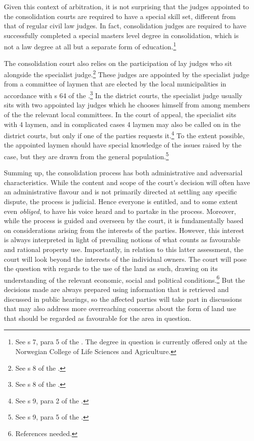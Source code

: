 Given this context of arbitration, it is not surprising that the judges appointed to the consolidation courts are required to have a special skill set, different from that of regular civil law judges. In fact, consolidation judges are required to have successfully completed a special masters level degree in consolidation, which is not a law degree at all but a separate form of education.\footnote{See s 7, para 5 of the \cite{lca79}. The degree in question is currently offered only at the Norwegian College of Life Sciences and Agriculture.} 

The consolidation court also relies on the participation of lay judges who sit alongside the specialist judge.\footnote{See s 8 of the \cite{lca79}.} These judges are appointed by the specialist judge from a committee of laymen that are elected by the local municipalities in accordance with s 64 of the \cite{ca15}.\footnote{See s 8 of the \cite{lca79}.} In the district courts, the specialist judge usually sits with two appointed lay judges which he chooses himself from among members of the the relevant local committees. In the court of appeal, the specialist sits with 4 laymen, and in complicated cases 4 laymen may also be called on in the district courts, but only if one of the parties requests it.\footnote{See s 9, para 2 of the \cite{lca79}.} To the extent possible, the appointed laymen should have special knowledge of the issues raised by the case, but they are drawn from the general population.\footnote{See s 9, para 5 of the \cite{lca79}.}

Summing up, the consolidation process has both administrative and adversarial characteristics. While the content and scope of the court's decision will often have an administrative flavour and is not primarily directed at settling any specific dispute, the process is judicial. Hence everyone is entitled, and to some extent even \emph{obliged}, to have his voice heard and to partake in the process. Moreover, while the process is guided and overseen by the court, it is fundamentally based on considerations arising from the interests of the parties. However, this interest is always interpreted in light of prevailing notions of what counts as favourable and rational property use. Importantly, in relation to this latter assessment, the court will look beyond the interests of the individual owners. The court will pose the question with regards to the use of the land as such, drawing on its understanding of the relevant economic, social and political conditions.\footnote{References needed.} But the decisions made are always prepared using information that is retrieved and discussed in public hearings, so the affected parties will take part in discussions that may also address more overreaching concerns about the form of land use that should be regarded as favourable for the area in question.

